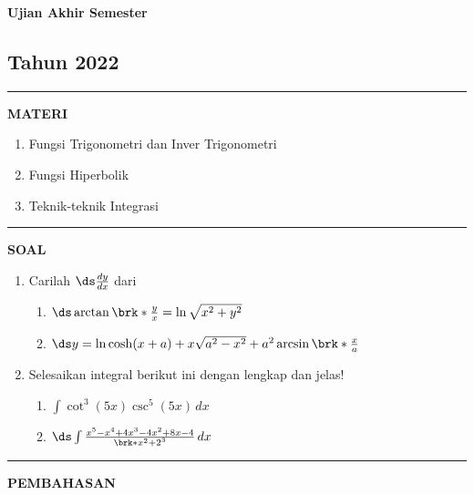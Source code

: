\newpage
\begin{flushright}
    \textbf{\Large{Ujian Akhir Semester}}
    \subsection*{Tahun 2022}
\end{flushright}
\vspace{0.5cm}
\hrule height 2pt
\vspace{0.5cm}
\begin{center}
    \textbf{\large{MATERI}}
    \begin{enumerate}[leftmargin=*, label={\arabic*}.]
        \item Fungsi Trigonometri dan Inver Trigonometri
        \item Fungsi Hiperbolik
        \item Teknik-teknik Integrasi
    \end{enumerate}
\end{center}
\vspace{0.2cm}
\hrule height 1pt
\vspace{0.5cm}
\begin{center}
    \textbf{\large{SOAL}}
\end{center}
\begin{enumerate}[leftmargin=*, label={\arabic*}.]
\item Carilah $\ds \frac{dy}{dx}$ dari 
\begin{enumerate}[label={\alph*}.]
    \item $\ds \arctan\brk*{\frac{y}{x}}=\ln\sqrt{x^{2}+y^{2}}$
    \item $\ds y=\ln \cosh (x+a)+x\sqrt{a^{2}-x^{2}}+a^{2}\arcsin\brk*{\frac{x}{a}}$
\end{enumerate}
\item Selesaikan integral berikut ini dengan lengkap dan jelas!
\begin{enumerate}[label={\alph*}.]
    \item $\int \cot^{3}(5x)\csc^{5}(5x)\,dx$  
    \item $\ds \int \frac{x^{5}-x^{4}+4x^{3}-4x^{2}+8x-4}{\brk*{x^{2}+2}^{3}}\,dx$
\end{enumerate}
\end{enumerate}
\vspace{0.2cm}
\hrule height 1pt
\vspace{0.5cm}
\begin{center}
    \textbf{\large{PEMBAHASAN}}
\end{center}
